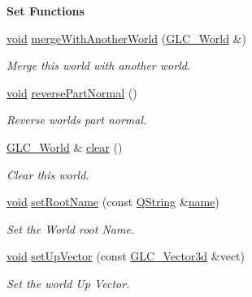 \begin{Indent}{\bf Set Functions}\par
\begin{DoxyCompactItemize}
\item 
\hyperlink{group___u_a_v_objects_plugin_ga444cf2ff3f0ecbe028adce838d373f5c}{void} \hyperlink{class_g_l_c___world_a40149b92af8bfb5f7f48d0cd2aba90b2}{merge\-With\-Another\-World} (\hyperlink{class_g_l_c___world}{G\-L\-C\-\_\-\-World} \&)
\begin{DoxyCompactList}\small\item\em Merge this world with another world. \end{DoxyCompactList}\item 
\hyperlink{group___u_a_v_objects_plugin_ga444cf2ff3f0ecbe028adce838d373f5c}{void} \hyperlink{class_g_l_c___world_a8a3a6eaa62cad57ab0c2eb0cbbbb13d7}{reverse\-Part\-Normal} ()
\begin{DoxyCompactList}\small\item\em Reverse worlds part normal. \end{DoxyCompactList}\item 
\hyperlink{class_g_l_c___world}{G\-L\-C\-\_\-\-World} \& \hyperlink{class_g_l_c___world_ac640f1aa65418bd9fac8f4be5807fde5}{clear} ()
\begin{DoxyCompactList}\small\item\em Clear this world. \end{DoxyCompactList}\item 
\hyperlink{group___u_a_v_objects_plugin_ga444cf2ff3f0ecbe028adce838d373f5c}{void} \hyperlink{class_g_l_c___world_a214854d4a41c384bacc9ada2390a8f1d}{set\-Root\-Name} (const \hyperlink{group___u_a_v_objects_plugin_gab9d252f49c333c94a72f97ce3105a32d}{Q\-String} \&\hyperlink{glext_8h_ad977737dfc9a274a62741b9500c49a32}{name})
\begin{DoxyCompactList}\small\item\em Set the World root Name. \end{DoxyCompactList}\item 
\hyperlink{group___u_a_v_objects_plugin_ga444cf2ff3f0ecbe028adce838d373f5c}{void} \hyperlink{class_g_l_c___world_a606c911687decc07ea5b0e14f91b3af1}{set\-Up\-Vector} (const \hyperlink{class_g_l_c___vector3d}{G\-L\-C\-\_\-\-Vector3d} \&vect)
\begin{DoxyCompactList}\small\item\em Set the world Up Vector. \end{DoxyCompactList}\item 

\end{DoxyCompactItemize}
\end{Indent}
